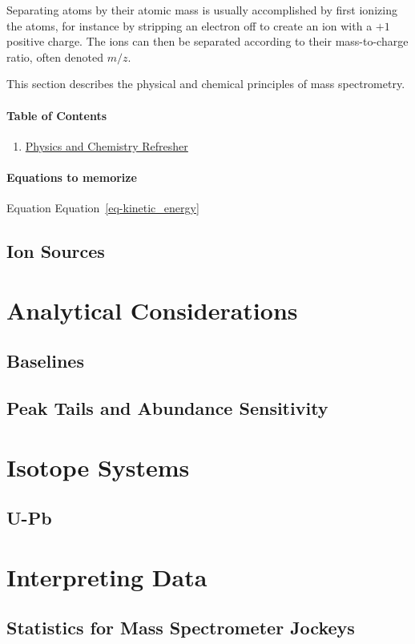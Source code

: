 \documentclass[
  letterpaper,
  DIV=11,
  numbers=noendperiod]{scrreprt}
\providecommand{\tightlist}{%
  \setlength{\itemsep}{0pt}\setlength{\parskip}{0pt}}\usepackage{longtable,booktabs,array}
\begin{document}
Separating atoms by their atomic mass is usually accomplished by first
ionizing the atoms, for instance by stripping an electron off to create
an ion with a \(+1\) positive charge. The ions can then be separated
according to their mass-to-charge ratio, often denoted \(m/z\).

This section describes the physical and chemical principles of mass
spectrometry.

\subsection{Table of Contents}\label{table-of-contents}

\begin{enumerate}
\def\labelenumi{\arabic{enumi}.}
\tightlist
\item
  \href{background.qmd}{Physics and Chemistry Refresher}
\end{enumerate}

\subsection{Equations to memorize}\label{equations-to-memorize}

Equation Equation~\ref{eq-kinetic_energy}

\chapter{Ion Sources}\label{ion-sources}

\part{Analytical Considerations}

\chapter{Baselines}\label{baselines}

\chapter{Peak Tails and Abundance
Sensitivity}\label{peak-tails-and-abundance-sensitivity}

\part{Isotope Systems}

\chapter{U-Pb}\label{u-pb}

\part{Interpreting Data}

\chapter{Statistics for Mass Spectrometer
Jockeys}\label{statistics-for-mass-spectrometer-jockeys}
\end{document}
